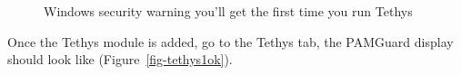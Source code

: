 \documentclass[
]{article}
\begin{document}
\begin{figure}


\caption{\label{fig-firewall}Windows security warning you'll get the
first time you run Tethys}

\end{figure}%

Once the Tethys module is added, go to the Tethys tab, the PAMGuard
display should look like (Figure~\ref{fig-tethys1ok}).
\end{document}
